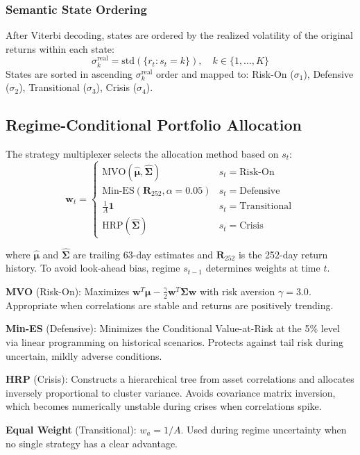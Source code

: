 \documentclass[conference, twocolumn]{IEEEtran}
\begin{document}
\subsubsection{Semantic State Ordering}
After Viterbi decoding, states are ordered by the realized volatility of the original returns within each state:
\begin{equation}
    \sigma_k^{\text{real}} = \text{std}\!\left(\{r_t : s_t = k\}\right), \quad k \in \{1,\ldots,K\}
\end{equation}
States are sorted in ascending $\sigma_k^{\text{real}}$ order and mapped to: Risk-On ($\sigma_1$), Defensive ($\sigma_2$), Transitional ($\sigma_3$), Crisis ($\sigma_4$).

\subsection{Regime-Conditional Portfolio Allocation}
\label{sec:portfolio}

The strategy multiplexer selects the allocation method based on $s_t$:
\begin{equation}
    \mathbf{w}_t = \begin{cases}
    \text{MVO}(\hat{\boldsymbol{\mu}}, \hat{\boldsymbol{\Sigma}})  & s_t = \text{Risk-On} \\
    \text{Min-ES}(\mathbf{R}_{252}, \alpha\!=\!0.05)              & s_t = \text{Defensive} \\
    \frac{1}{A}\mathbf{1}                                          & s_t = \text{Transitional} \\
    \text{HRP}(\hat{\boldsymbol{\Sigma}})                          & s_t = \text{Crisis}
    \end{cases}
\label{eq:allocator}
\end{equation}

where $\hat{\boldsymbol{\mu}}$ and $\hat{\boldsymbol{\Sigma}}$ are trailing 63-day estimates and $\mathbf{R}_{252}$ is the 252-day return history. To avoid look-ahead bias, regime $s_{t-1}$ determines weights at time $t$.

\textbf{MVO} (Risk-On): Maximizes $\mathbf{w}^T\boldsymbol{\mu} - \frac{\gamma}{2}\mathbf{w}^T\boldsymbol{\Sigma}\mathbf{w}$ with risk aversion $\gamma = 3.0$. Appropriate when correlations are stable and returns are positively trending.

\textbf{Min-ES} (Defensive): Minimizes the Conditional Value-at-Risk at the 5\% level via linear programming on historical scenarios. Protects against tail risk during uncertain, mildly adverse conditions.

\textbf{HRP} (Crisis): Constructs a hierarchical tree from asset correlations and allocates inversely proportional to cluster variance. Avoids covariance matrix inversion, which becomes numerically unstable during crises when correlations spike.

\textbf{Equal Weight} (Transitional): $w_a = 1/A$. Used during regime uncertainty when no single strategy has a clear advantage.


\end{document}
